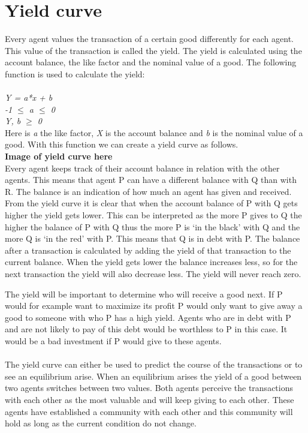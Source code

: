 \documentclass[twoside,openright]{uva-bachelor-thesis}
\begin{document}
\section{Yield curve}
Every agent values the transaction of a certain good differently for each agent. This value of the transaction is called the yield. The yield is calculated using the account balance, the like factor and the nominal value of a good. The following function is used to calculate the yield:
\\
\\
\textit{Y = a*x + b} \\
\textit{-1 $\le$ a $\le$ 0} \\
\textit{Y, b $\ge$ 0} \\
Here is \textit{a} the like factor, \textit{X} is the account balance and \textit{b} is the nominal value of a good. With this function we can create a yield curve as follows.
\\
\textbf{Image of yield curve here}
\\
Every agent keeps track of their account balance in relation with the other agents. This means that agent P can have a different balance with Q than with R. The balance is an indication of how much an agent has given and received. From the yield curve it is clear that when the account balance of P with Q gets higher the yield gets lower. This can be interpreted as the more P gives to Q the higher the balance of P with Q thus the more P is ‘in the black’ with Q and the more Q is ‘in the red’ with P. This means that Q is in debt with P. The balance after a transaction is calculated by adding the yield of that transaction to the current balance. When the yield gets lower the balance increases less, so for the next transaction the yield will also decrease less. The yield will never reach zero.

The yield will be important to determine who will receive a good next. If P would for example want to maximize its profit P would only want to give away a good to someone with who P has a high yield. Agents who are in debt with P and are not likely to pay of this debt would be worthless to P in this case. It would be a bad investment if P would give to these agents.
\\
\\
The yield curve can either be used to predict the course of the transactions or to see an equilibrium arise. When an equilibrium arises the yield of a good between two agents switches between two values.  Both agents perceive the transactions with each other as the most valuable and will keep giving to each other. These agents have established a community with each other and this community will hold as long as the current condition do not change. 
\end{document}
